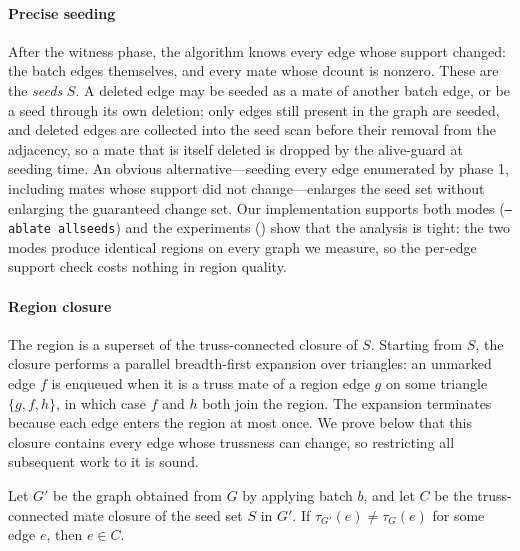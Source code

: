 \paragraph{Precise seeding}
After the witness phase, the algorithm knows every edge whose support changed: the batch edges themselves, and every mate whose $\mathrm{dcount}$ is nonzero.
These are the \emph{seeds} $S$.
A deleted edge may be seeded as a mate of another batch edge, or be a seed through its own deletion; only edges still present in the graph are seeded, and deleted edges are collected into the seed scan before their removal from the adjacency, so a mate that is itself deleted is dropped by the alive-guard at seeding time.
An obvious alternative---seeding every edge enumerated by phase 1, including mates whose support did not change---enlarges the seed set without enlarging the guaranteed change set.
Our implementation supports both modes (\texttt{--ablate allseeds}) and the experiments () show that the analysis is tight: the two modes produce identical regions on every graph we measure, so the per-edge support check costs nothing in region quality.

\paragraph{Region closure}
The region is a superset of the truss-connected closure of $S$.
Starting from $S$, the closure performs a parallel breadth-first expansion over triangles: an unmarked edge $f$ is enqueued when it is a truss mate of a region edge $g$ on some triangle $\{g,f,h\}$, in which case $f$ and $h$ both join the region.
The expansion terminates because each edge enters the region at most once.
We prove below that this closure contains every edge whose trussness can change, so restricting all subsequent work to it is sound.

\begin{lemma}[Coverage]
\label{lem:coverage}
Let $G'$ be the graph obtained from $G$ by applying batch $b$, and let $C$ be the truss-connected mate closure of the seed set $S$ in $G'$.
If $\tau_{G'}(e)\ne \tau_G(e)$ for some edge $e$, then $e\in C$.
\end{lemma}

